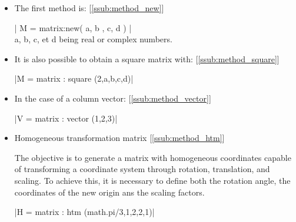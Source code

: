 \begin{itemize}

\item  The first method is: [\ref{ssub:method_new}]

\begin{minipage}{.5\textwidth}
\begin{mybox}
   | M = matrix:new({ { a, b }, { c, d } }) | \\
   a, b, c, et d being real or complex numbers.
\end{mybox}
\end{minipage}
\begin{minipage}{.4\textwidth}

  \end{minipage}


\item  It is also possible to obtain a square matrix with: [\ref{ssub:method_square}]

  \begin{mybox}
  |M = matrix : square (2,a,b,c,d)| 
  \end{mybox}

\item  In the case of a column vector: [\ref{ssub:method_vector}]

\begin{minipage}{.5\textwidth}
  \begin{mybox}
  |V = matrix : vector (1,2,3)| 
  \end{mybox}
\end{minipage}
\begin{minipage}{.4\textwidth}
\end{minipage}

\item  Homogeneous transformation matrix [\ref{ssub:method_htm}]

  The objective is to generate a matrix with homogeneous coordinates capable of transforming a coordinate system through rotation, translation, and scaling. To achieve this, it is necessary to define both the rotation angle, the coordinates of the new origin ans the scaling factors.

\begin{minipage}{.5\textwidth}
  \begin{mybox}
  |H = matrix : htm (math.pi/3,1,2,2,1)| 
  \end{mybox}
  \end{minipage}
\begin{minipage}{.4\textwidth}
  \end{minipage}
  
\end{itemize}

